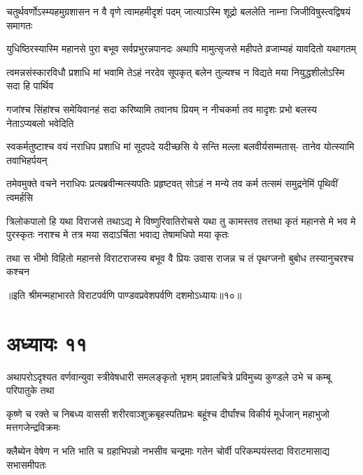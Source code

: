 


\fourlineindentedshloka
{चतुर्थवर्णोऽस्म्यहमुग्रशासन}
{न वै वृणे त्वामहमीदृशं पदम्}
{जात्याऽस्मि शूद्रो बललेति नाम्ना}
{जिजीविषुस्त्वद्विषयं समागतः}


\fourlineindentedshloka
{युधिष्ठिरस्यास्मि महानसे पुरा}
{बभूव सर्वप्रभुरन्नपानदः}
{अथापि मामुत्सृजसे महीपते}
{व्रजाम्यहं यावदितो यथागतम्}


\fourlineindentedshloka
{त्वमन्नसंस्कारविधौ प्रशाधि मां}
{भवामि तेऽहं नरदेव सूपकृत्}
{बलेन तुल्यश्च न विद्यते मया}
{नियुद्धशीलोऽस्मि सदा हि पार्थिव}


\fourlineindentedshloka
{गजांश्च सिंहांश्च समेयिवानहं}
{सदा करिष्यामि तवानघ प्रियम्}
{न नीचकर्मा तव मादृशः प्रभो}
{बलस्य नेताऽप्यबलो भवेदिति}


\fourlineindentedshloka
{स्वकर्मतुष्टाश्च वयं नराधिप}
{प्रशाधि मां सूदपदे यदीच्छसि}
{ये सन्ति मल्ला बलवीर्यसम्मतास्-}
{तानेव योत्स्यामि तवाभिहर्पयन्}



\fourlineindentedshloka
{तमेवमुक्ते वचने नराधिपः}
{प्रत्यब्रवीन्मत्स्यपतिः प्रहृष्टवत्}
{सोऽहं न मन्ये तव कर्म तत्समं}
{समुद्रनेमिं पृथिवीं त्वमर्हसि}


\sixlineindentedshloka
{त्रिलोकपालो हि यथा विराजसे}
{तथाऽद्य मे विष्णुरिवातिरोचसे}
{यथा तु कामस्तव तत्तथा कृतं}
{महानसे मे भव मे पुरस्कृतः}
{नराश्च मे तत्र मया सदाऽर्चिता}
{भवाद्य तेषामधिपो मया कृतः}


\fourlineindentedshloka
{तथा स भीमो विहितो महानसे}
{विराटराजस्य बभूव वै प्रियः}
{उवास राजन्न च तं पृथग्जनो}
{बुबोध तस्यानुचरश्च कश्चन}

॥इति श्रीमन्महाभारते विराटपर्वणि पाण्डवप्रवेशपर्वणि दशमोऽध्यायः॥१०॥

\chapter{अध्यायः ११}

\fourlineindentedshloka
{अथापरोऽदृश्यत वर्णवान्युवा}
{स्त्रीवेषधारी समलङ्कृतो भृशम्}
{प्रवालचित्रे प्रविमुच्य कुण्डले}
{उभे च कम्बू परिपातुके तथा}


\fourlineindentedshloka
{कृष्णे च रक्ते च निबध्य वाससी}
{शरीरवाञ्शुक्रबृहस्पतिप्रभः}
{बहूंश्च दीर्घांश्च विकीर्य मूर्धजान्}
{महाभुजो मत्तगजेन्द्रविक्रमः}


\fourlineindentedshloka
{क्लैब्येन वेषेण न भति भाति च}
{ग्रहाभिपन्नो नभसीव चन्द्रमाः}
{गतेन चोर्वी परिकम्पयंस्तदा}
{विराटमासाद्य सभासमीपतः}



